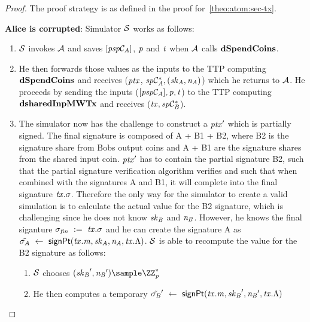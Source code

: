 \begin{proof}
   The proof strategy is as defined in the proof for~\cref{theo:atom:sec-tx}.

    \textbf{Alice is corrupted}: Simulator $\mathcal{S}$ works as follows:
    \begin{enumerate}
        \item $\mathcal{S}$ invokes $\mathcal{A}$ and saves $[\mathit{psp}\mathcal{C}_{\mathit{A}}]$, $\mathit{p}$ and $\mathit{t}$ when $\mathcal{A}$ calls $\mathbf{dSpendCoins}$.
        \item He then forwards those values as the inputs to the TTP computing $\mathbf{dSpendCoins}$ and receives ($\mathit{ptx}$, $\mathit{sp}\mathcal{C}_{\mathit{A}}^*, (\mathit{sk}_{\mathit{A}}, \mathit{\mathit{n}_{\mathit{A}}})$) which he returns to $\mathcal{A}$.
        He proceeds by sending the inputs ($[\mathit{psp}\mathcal{C}_{\mathit{A}}], \mathit{p}, \mathit{t}$) to the TTP computing $\mathbf{dsharedInpMWTx}$ and receives ($\mathit{tx}, \mathit{sp}\mathcal{C}_{\mathit{B}}^*$).
        \item The simulator now has the challenge to construct a ${\mathit{ptx}}'$ which is partially signed.
        The final signature is composed of A + B1 + B2, where B2 is the signature share from Bobs output coins and A + B1 are the signature shares from the shared input coin.
        ${\mathit{ptx}}'$ has to contain the partial signature B2, such that the partial signature verification algorithm verifies and such that when combined with the signatures A and B1, it will complete into the final signature $\mathit{tx}.\sigma$.
        Therefore the only way for the simulator to create a valid simulation is to calculate the actual value for the B2 signature, which is challenging since he does not know $\mathit{sk}_{\mathit{B}}$ and $\mathit{\mathit{n}_{\mathit{B}}}$.
        However, he knows the final siganture $\sigma_{\mathit{fin}} ~:=~ \mathit{tx}.\sigma$ and he can create the signature A as $\tilde{\sigma_{\mathit{A}}} ~\leftarrow~ \mathsf{signPt}(\mathit{tx}.\mathit{m}, \mathit{sk}_{\mathit{A}}, \mathit{\mathit{n}_{\mathit{A}}}, \mathit{tx}.\Lambda)$.
        $\mathcal{S}$ is able to recompute the value for the B2 signature as follows:
        \begin{enumerate}
            \item $\mathcal{S}$ chooses $(\funStarAlt{\varSecKeyBob}, \funStarAlt{\varNonceBob}) \sample \cnstIntegersPrimeWithoutZero{\varPrime}$
            \item He then computes a temporary ${\tilde{\sigma_{\mathit{B}}}}' ~\leftarrow~ \mathsf{signPt}(\mathit{tx}.\mathit{m}, {\mathit{sk}_{\mathit{B}}}', {\mathit{\mathit{n}_{\mathit{B}}}}', \mathit{tx}.\Lambda)$

\end{enumerate}
\end{enumerate}
\end{proof}
